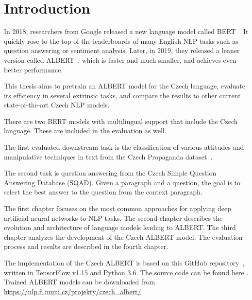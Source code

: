 \documentclass[
  printed, %
  color,   %
  table,   %
  oneside, %
  lof,     %
  lot,     %
]{fithesis3}
\begin{document}
\chapter*{Introduction}


In 2018, researchers from Google released a new language model called BERT~\parencite{bert}. It quickly rose to the top of the leaderboards of many English NLP tasks such as question answering or sentiment analysis. Later, in 2019, they released a leaner version called ALBERT~\parencite{albert}, which is faster and much smaller, and achieves even better performance.

This thesis aims to pretrain an ALBERT model for the Czech language, evaluate its efficiency in several extrinsic tasks, and compare the results to other current state-of-the-art Czech NLP models. 

There are two BERT models with multilingual support that include the Czech language. These are included in the evaluation as well.

The first evaluated downstream task is the classification of various attitudes and manipulative techniques in text from the Czech Propaganda dataset~\parencite{propaganda}. 

The second task is question answering from the Czech Simple Question Answering Database (SQAD)\parencite{sqad}. Given a paragraph and a question, the goal is to select the best answer to the question from the context paragraph.

The first chapter focuses on the most common approaches for applying deep artificial neural networks to NLP tasks. The second chapter describes the evolution and architecture of language models leading to ALBERT. The third chapter analyzes the development of the Czech ALBERT model. The evaluation process and results are described in the fourth chapter.

The implementation of the Czech ALBERT is based on this GitHub repository~\parencite{albert_repo}, written in TensorFlow v1.15 and Python 3.6. The source code can be found here \parencite{thesis_repo}. Trained ALBERT models can be downloaded from \url{https://nlp.fi.muni.cz/projekty/czech_albert/}.

\end{document}
